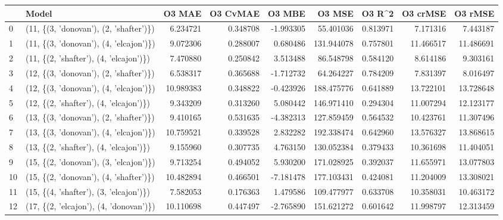 \begin{tabular}{llrrrrrrr}
\toprule
{} &                                   Model &     O3 MAE &  O3 CvMAE &    O3 MBE &      O3 MSE &    O3 R\textasciicircum2 &   O3 crMSE &    O3 rMSE \\
\midrule
0  &  (11, \{(3, 'donovan'), (2, 'shafter')\}) &   6.234721 &  0.348708 & -1.993305 &   55.401036 &  0.813971 &   7.171316 &   7.443187 \\
1  &  (11, \{(3, 'donovan'), (4, 'elcajon')\}) &   9.072306 &  0.288007 &  0.680486 &  131.944078 &  0.757801 &  11.466517 &  11.486691 \\
2  &  (11, \{(2, 'shafter'), (4, 'elcajon')\}) &   7.470880 &  0.250842 &  3.513488 &   86.548798 &  0.584120 &   8.614186 &   9.303161 \\
3  &  (12, \{(3, 'donovan'), (2, 'shafter')\}) &   6.538317 &  0.365688 & -1.712732 &   64.264227 &  0.784209 &   7.831397 &   8.016497 \\
4  &  (12, \{(3, 'donovan'), (4, 'elcajon')\}) &  10.989383 &  0.348822 & -0.423926 &  188.475776 &  0.641889 &  13.722101 &  13.728648 \\
5  &  (12, \{(2, 'shafter'), (4, 'elcajon')\}) &   9.343209 &  0.313260 &  5.080442 &  146.971410 &  0.294304 &  11.007294 &  12.123177 \\
6  &  (13, \{(3, 'donovan'), (2, 'shafter')\}) &   9.410165 &  0.531635 & -4.382313 &  127.859459 &  0.564532 &  10.423761 &  11.307496 \\
7  &  (13, \{(3, 'donovan'), (4, 'elcajon')\}) &  10.759521 &  0.339528 &  2.832282 &  192.338474 &  0.642960 &  13.576327 &  13.868615 \\
8  &  (13, \{(2, 'shafter'), (4, 'elcajon')\}) &   9.155960 &  0.307735 &  4.763150 &  130.052384 &  0.379433 &  10.361698 &  11.404051 \\
9  &  (15, \{(2, 'donovan'), (3, 'elcajon')\}) &   9.713254 &  0.494052 &  5.930200 &  171.028925 &  0.392037 &  11.655971 &  13.077803 \\
10 &  (15, \{(2, 'donovan'), (4, 'shafter')\}) &  10.482894 &  0.466501 & -7.181478 &  177.103431 &  0.424081 &  11.204009 &  13.308021 \\
11 &  (15, \{(4, 'shafter'), (3, 'elcajon')\}) &   7.582053 &  0.176363 &  1.479586 &  109.477977 &  0.633708 &  10.358031 &  10.463172 \\
12 &  (17, \{(2, 'elcajon'), (4, 'donovan')\}) &  10.110698 &  0.447497 & -2.765890 &  151.621272 &  0.601642 &  11.998797 &  12.313459 \\

\end{tabular}

